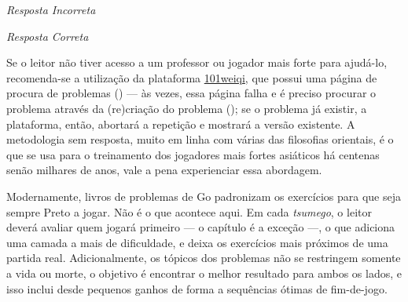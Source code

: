 \hspace{1cm}
\noindent
\begin{minipage}[c]{0.4\linewidth}
  \centering
  \textit{Resposta Incorreta}
  \begin{goban}[board dimension       = 12,
                board size            = 19,
                scale                 = 1,
                outline line width    = 0.55mm,
                horizontal clip start = 11,
                horizontal clip end   = 19,
                vertical clip start   = 13,
                vertical clip end     = 19,]
  \end{goban}%
\end{minipage}
\begin{minipage}[c]{0.4\linewidth}
  \centering
  \textit{Resposta Correta}
  \begin{goban}[board dimension       = 12,
                board size            = 19,
                scale                 = 1,
                outline line width    = 0.55mm,
                horizontal clip start = 11,
                horizontal clip end   = 19,
                vertical clip start   = 13,
                vertical clip end     = 19,]
  \end{goban}%
\end{minipage}

\vspace{1.1cm}

\fontsize{16}{16}\selectfont

Se o leitor não tiver acesso a um professor ou jogador mais forte para ajudá-lo, recomenda-se a utilização da plataforma \href{https://www.101weiqi.com/}{101weiqi}, que possui uma página de procura de problemas (\href{https://www.101weiqi.com/search/}{}) --- às vezes, essa página falha e é preciso procurar o problema através da (re)criação do problema (\href{https://www.101weiqi.com/input/}{}); se o problema já existir, a plataforma, então, abortará a repetição e mostrará a versão existente. A metodologia sem resposta, muito em linha com várias das filosofias orientais, é o que se usa para o treinamento dos jogadores mais fortes asiáticos há centenas senão milhares de anos, vale a pena experienciar essa abordagem.

Modernamente, livros de problemas de Go padronizam os exercícios para que seja sempre Preto a jogar. Não é o que acontece aqui. Em cada \textit{tsumego}, o leitor deverá avaliar quem jogará primeiro --- o capítulo  é a exceção ---, o que adiciona uma camada a mais de dificuldade, e deixa os exercícios mais próximos de uma partida real. Adicionalmente, os tópicos dos problemas não se restringem somente a vida ou morte, o objetivo é encontrar o melhor resultado para ambos os lados, e isso inclui desde pequenos ganhos de forma a sequências ótimas de fim-de-jogo.

